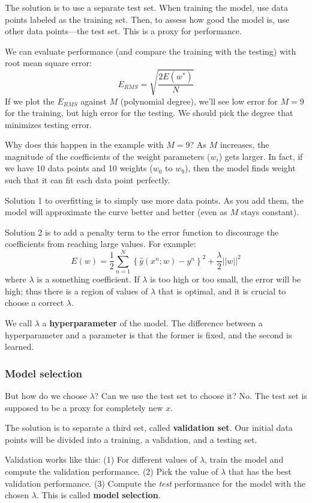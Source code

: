 \documentclass[a4paper,12pt]{article}
\begin{document}
The solution is to use a separate test set. When training the model, use data points labeled as the training set. Then, to assess how good the model is, use other data points---the test set. This is a proxy for performance. 

We can evaluate performance (and compare the training with the testing) with root mean square error: 
$$E_{RMS} = \sqrt{\frac{2E(w^*)}{N}}$$
If we plot the $E_{RMS}$ against $M$ (polynomial degree), we'll see low error for $M=9$ for the training, but high error for the testing. We should pick the degree that minimizes testing error. 

Why does this happen in the example with $M=9$? As $M$ increases, the magnitude of the coefficients of the weight parameters ($w_i$) gets larger. In fact, if we have 10 data points and 10 weights ($w_0$ to $w_9$), then the model finds weight such that it can fit each data point perfectly. 

Solution 1 to overfitting is to simply use more data points. As you add them, the model will approximate the curve better and better (even as $M$ stays constant). 

Solution 2 is to add a penalty term to the error function to discourage the coefficients from reaching large values. For example: 
$$E(w) = \frac{1}{2} \sum_{n=1}^N \left\{ \hat y(x^n; w) - y^n\right\}^2 + \frac{\lambda}{2}||w||^2$$
where $\lambda$ is a something coefficient. If $\lambda$ is too high or too small, the error will be high; thus there is a region of values of $\lambda$ that is optimal, and it is crucial to choose a correct $\lambda$.

We call $\lambda$ a \textbf{hyperparameter} of the model. The difference between a hyperparameter and a parameter is that the former is fixed, and the second is learned. 
\subsubsection{Model selection}

But how do we choose $\lambda$? Can we use the test set to choose it? No. The test set is supposed to be a proxy for completely new $x$. 

The solution is to separate a third set, called \textbf{validation set}. Our initial data points will be divided into a training, a validation, and a testing set. 

Validation works like this: (1) For different values of $\lambda$, train the model and compute the validation performance. (2) Pick the value of $\lambda$ that has the best validation performance. (3) Compute the \textit{test} performance for the model with the chosen $\lambda$. This is called \textbf{model selection}. 
\end{document}
